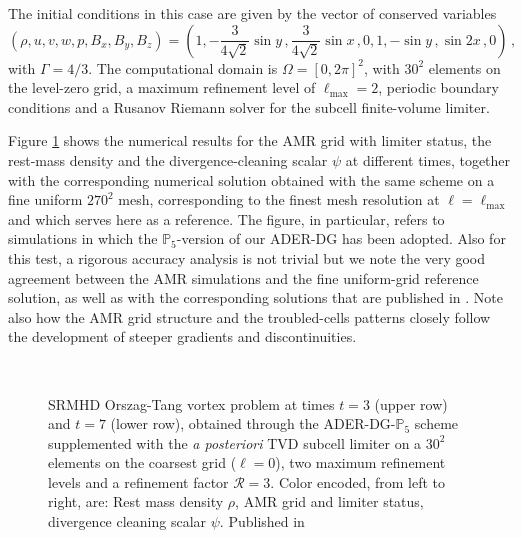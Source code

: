 The initial conditions in this case are given by the vector of conserved
variables 
%
\begin{equation*}
\left( \rho, u, v, w, p, B_x ,B_y,B_z \right) = \left( 1 , -
  \frac{3}{4\sqrt{2}}\sin y\,, \frac{3}{4\sqrt{2}}\sin x \,, 0, 1, - \sin
  y\,, \sin 2x \,, 0 \right)\,,
\end{equation*}
%
with $\Gamma=4/3$. The computational domain is $\Omega = [0,2\pi]^2$,
with $30^2$ elements on the level-zero grid, a maximum refinement level
of $\ell_{\text{max}}=2$, periodic boundary conditions and a Rusanov
Riemann solver for the subcell finite-volume limiter.

Figure \ref{fig:OrszagTang} shows the numerical results for the AMR grid {
with limiter status, the rest-mass density and the divergence-cleaning scalar 
$\psi$ at different times, together}
with the corresponding numerical solution obtained with the same scheme
on a fine uniform $270^2$ mesh, corresponding to the finest mesh
resolution at $\ell=\ell_{\text{max}}$ and which serves here as a
reference. The figure, in particular, refers to simulations in which the
$\mathbb{P}_5$-version of our ADER-DG has been adopted. Also for this
test, a rigorous accuracy analysis is not trivial but we note the very
good agreement between the AMR simulations and the fine uniform-grid
reference solution, as well as with the corresponding solutions that
are published in \cite{Zanotti2015d,Porth2017}. 
Note also how the AMR grid structure and the troubled-cells
patterns closely follow the development of steeper gradients and 
discontinuities.

%
\begin{figure}
	\caption[
	SRMHD Orszag-Tang vortex 
	]{SRMHD Orszag-Tang vortex problem at times
		$t=3$ (upper row) and $t=7$ (lower row), obtained through
		the ADER-DG-$\mathbb{P}_5$ scheme supplemented with the \textit{a 
		posteriori} 
		TVD subcell limiter on a $30^2$ elements on the coarsest grid
		($\ell=0$), two maximum refinement levels and a refinement factor
		$\mathcal{R}=3$. Color encoded, from left to right, are:
		Rest mass density $\rho$, AMR grid and limiter status,
		divergence cleaning scalar $\psi$.
	    Published in \cite{Fambri2018}
    }
	\label{fig:OrszagTang}
	\\
\end{figure}
%


